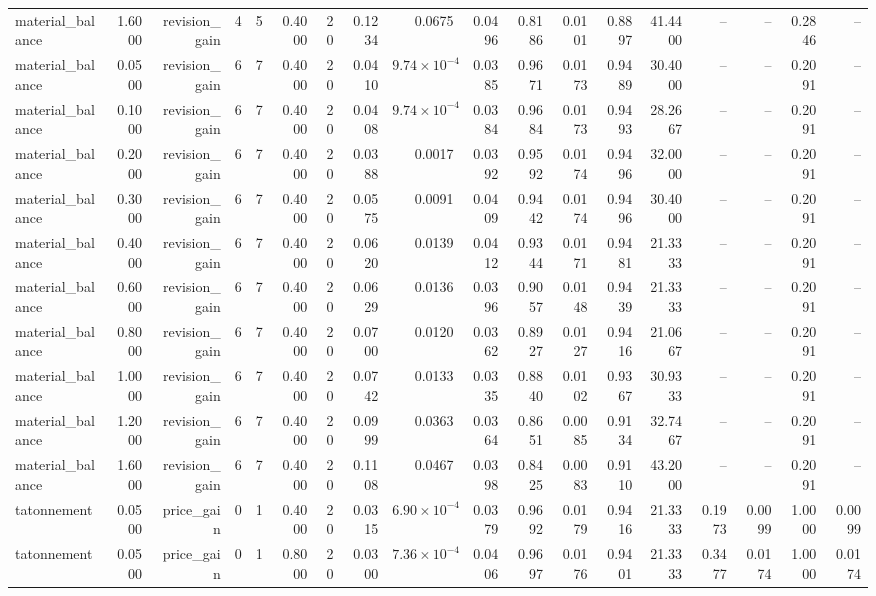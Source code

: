 \begin{table}[htbp]
\begin{tabular}{lrrrrrrrrrrrrrrrrr}
material\_balance & 1.6000 & revision\_gain & 4 & 5 & 0.4000 & 20 & 0.1234 & 0.0675 & 0.0496 & 0.8186 & 0.0101 & 0.8897 & 41.4400 & -- & -- & 0.2846 & -- \\
material\_balance & 0.0500 & revision\_gain & 6 & 7 & 0.4000 & 20 & 0.0410 & $9.74\times10^{-4}$ & 0.0385 & 0.9671 & 0.0173 & 0.9489 & 30.4000 & -- & -- & 0.2091 & -- \\
material\_balance & 0.1000 & revision\_gain & 6 & 7 & 0.4000 & 20 & 0.0408 & $9.74\times10^{-4}$ & 0.0384 & 0.9684 & 0.0173 & 0.9493 & 28.2667 & -- & -- & 0.2091 & -- \\
material\_balance & 0.2000 & revision\_gain & 6 & 7 & 0.4000 & 20 & 0.0388 & 0.0017 & 0.0392 & 0.9592 & 0.0174 & 0.9496 & 32.0000 & -- & -- & 0.2091 & -- \\
material\_balance & 0.3000 & revision\_gain & 6 & 7 & 0.4000 & 20 & 0.0575 & 0.0091 & 0.0409 & 0.9442 & 0.0174 & 0.9496 & 30.4000 & -- & -- & 0.2091 & -- \\
material\_balance & 0.4000 & revision\_gain & 6 & 7 & 0.4000 & 20 & 0.0620 & 0.0139 & 0.0412 & 0.9344 & 0.0171 & 0.9481 & 21.3333 & -- & -- & 0.2091 & -- \\
material\_balance & 0.6000 & revision\_gain & 6 & 7 & 0.4000 & 20 & 0.0629 & 0.0136 & 0.0396 & 0.9057 & 0.0148 & 0.9439 & 21.3333 & -- & -- & 0.2091 & -- \\
material\_balance & 0.8000 & revision\_gain & 6 & 7 & 0.4000 & 20 & 0.0700 & 0.0120 & 0.0362 & 0.8927 & 0.0127 & 0.9416 & 21.0667 & -- & -- & 0.2091 & -- \\
material\_balance & 1.0000 & revision\_gain & 6 & 7 & 0.4000 & 20 & 0.0742 & 0.0133 & 0.0335 & 0.8840 & 0.0102 & 0.9367 & 30.9333 & -- & -- & 0.2091 & -- \\
material\_balance & 1.2000 & revision\_gain & 6 & 7 & 0.4000 & 20 & 0.0999 & 0.0363 & 0.0364 & 0.8651 & 0.0085 & 0.9134 & 32.7467 & -- & -- & 0.2091 & -- \\
material\_balance & 1.6000 & revision\_gain & 6 & 7 & 0.4000 & 20 & 0.1108 & 0.0467 & 0.0398 & 0.8425 & 0.0083 & 0.9110 & 43.2000 & -- & -- & 0.2091 & -- \\
tatonnement & 0.0500 & price\_gain & 0 & 1 & 0.4000 & 20 & 0.0315 & $6.90\times10^{-4}$ & 0.0379 & 0.9692 & 0.0179 & 0.9416 & 21.3333 & 0.1973 & 0.0099 & 1.0000 & 0.0099 \\
tatonnement & 0.0500 & price\_gain & 0 & 1 & 0.8000 & 20 & 0.0300 & $7.36\times10^{-4}$ & 0.0406 & 0.9697 & 0.0176 & 0.9401 & 21.3333 & 0.3477 & 0.0174 & 1.0000 & 0.0174 \\

\end{tabular}
\end{table}
